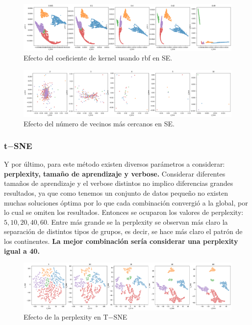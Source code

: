 \documentclass[paper=letter, fontsize=11pt]{scrartcl}
\numberwithin{equation}{section} %
\numberwithin{figure}{section} %
\numberwithin{table}{section} %
\begin{document}
\begin{figure}[H]
    \centering
    \includegraphics[scale=0.35]{figure/se_gamma.png}
    \caption{Efecto del coeficiente de kernel usando rbf en SE.}
    \label{fig:se_gamma}
\end{figure}

\begin{figure}[H]
    \centering
    \includegraphics[scale=0.35]{figure/se_neighbors.png}
    \caption{Efecto del número de vecinos más cercanos en SE.}
    \label{fig:se_neighbors}
\end{figure}
\subsubsection*{t$-$SNE}
Y por último, para este método existen diversos parámetros a considerar: \textbf{perplexity, tamaño de aprendizaje y verbose.} Considerar diferentes tamaños de aprendizaje y el verbose distintos no implico diferencias grandes resultados, ya que como tenemos un conjunto de datos pequeño no existen muchas soluciones óptima por lo que cada combinación convergió a la global, por lo cual se omiten los resultados. Entonces se ocuparon los valores de perplexity: $5, 10, 20, 40, 60$. Entre más grande se la perplexity se observan más claro la separación de distintos tipos de grupos, es decir, se hace más claro el patrón de los continentes. \textbf{La mejor combinación sería considerar una perplexity igual a 40.}
\begin{figure}[H]
    \centering
    \includegraphics[scale=0.3]{figure/tsne_perplexity.png}
    \caption{Efecto de la perplexity en T$-$SNE}
    \label{fig:tsne_perplexity}
\end{figure}
\end{document}
